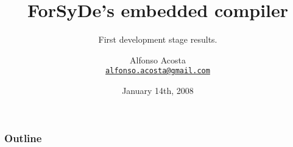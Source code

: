 \documentclass{beamer}
\title%
{ForSyDe's embedded compiler}
\subtitle{First development stage results.}
\author[A.Acosta] %
{Alfonso Acosta\\
\footnotesize \href{mailto:alfonso.acosta@gmail.com}{\nolinkurl{alfonso.acosta@gmail.com}}}
\institute[KTH] %
{ICT/ECS\\Royal Institute of Technology, Stockholm}
\date%
{January 14th, 2008}
\begin{document}
\begin{frame}
  \titlepage
\end{frame}

\begin{frame}
  \frametitle{Outline}
  \tableofcontents[pausesections]
\end{frame}





\beamerdefaultoverlayspecification{}
\end{document}
